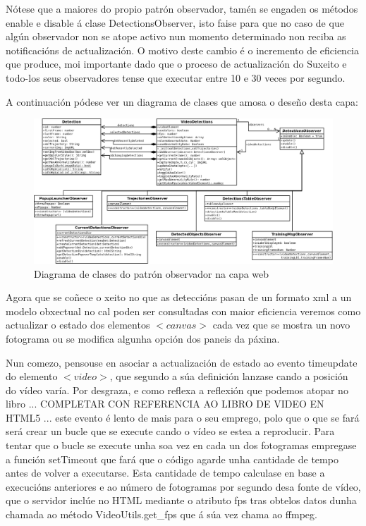     Nótese que a maiores do propio patrón observador, tamén se engaden os métodos enable e disable á
    clase DetectionsObserver, isto faise para que no caso de que algún observador non se atope 
    activo nun momento determinado non reciba as notificacións de actualización. O motivo deste
    cambio é o incremento de eficiencia que produce, moi importante dado que o proceso de actualización
    do Suxeito e todo-los seus observadores tense que executar entre 10 e 30 veces por segundo.
    
    A continuación pódese ver un diagrama de clases que amosa o deseño desta capa:
    
    \begin{figure}[htp]
    \begin{center}
        \includegraphics[scale=0.2]{figures/CapaWebJS.png}
        \caption{Diagrama de clases do patrón observador na capa web}
    \label{fig:CapaWebJS}
    \end{center}
    \end{figure}
    
    Agora que se coñece o xeito no que as deteccións pasan de un formato xml a un modelo obxectual 
    no cal poden ser consultadas con maior eficiencia veremos como actualizar o estado dos elementos
    $<canvas>$ cada vez que se mostra un novo fotograma ou se modifica algunha opción dos paneis da
    páxina.
    
    Nun comezo, pensouse en asociar a actualización de estado ao evento timeupdate do elemento 
    $<video>$, que segundo a súa definición lanzase cando a posición do vídeo varía. Por desgraza, 
    e como reflexa a reflexión que podemos atopar no libro ... COMPLETAR CON REFERENCIA AO LIBRO DE
    VIDEO EN HTML5 ... este evento é lento de mais para o seu emprego, polo que o que se fará será
    crear un bucle que se execute cando o vídeo se estea a reproducir. Para tentar que o bucle se 
    execute unha soa vez en cada un dos fotogramas empregase a función setTimeout que fará que o 
    código agarde unha cantidade de tempo antes de volver a executarse. Esta cantidade de tempo 
    calculase en base a execucións anteriores e ao número de fotogramas por segundo desa fonte de 
    vídeo, que o servidor inclúe no HTML mediante o atributo fps tras obtelos datos dunha chamada ao
    método VideoUtils.get\_fps que á súa vez chama ao ffmpeg.
    
